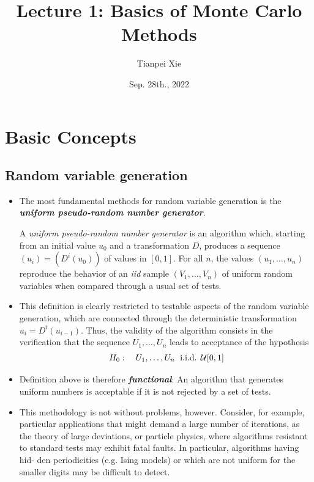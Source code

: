 \documentclass[11pt]{article}
\begin{document}
\title{Lecture 1: Basics of Monte Carlo Methods}
\author{ Tianpei Xie}
\date{Sep. 28th., 2022 }
\maketitle
\tableofcontents
\newpage
\allowdisplaybreaks
\section{Basic Concepts}
\subsection{Random variable generation}
\begin{itemize}
\item The most fundamental methods for random variable generation is the \emph{\textbf{uniform pseudo-random number generator}}.
\begin{definition}
 A \emph{uniform pseudo-random number generator} is an algorithm which, starting from an initial value $u_0$ and a transformation $D$, produces a sequence $(u_i) = (D^i(u_{0}))$ of values in $[0, 1]$. For all $n$, the values $(u_1, \ldots , u_n)$ reproduce the behavior of an \emph{iid} sample $(V_1, \ldots, V_n)$ of uniform random variables when compared through a usual set of tests.
 \end{definition}

\item This definition is clearly restricted to testable aspects of the random variable generation, which are connected through the deterministic transformation $u_i = D^{i}(u_{i-1})$. Thus, the validity of the algorithm consists in the verification that the sequence $U_1, \ldots, U_n$ leads to acceptance of the hypothesis
\begin{align*}
H_0: \quad U_1, \ldots, U_n \;\text{ i.i.d. } {\mathcal U}[0,1]
\end{align*}

\item Definition above is therefore \emph{\textbf{functional}}: An algorithm that generates uniform numbers is acceptable if it is not rejected by a set of tests. 

\item This methodology is not without problems, however. Consider, for example, particular applications that might demand a large number of iterations, as the theory of large deviations, or particle physics, where algorithms resistant to standard tests may exhibit fatal faults. In particular, algorithms having hid- den periodicities (e.g. Ising models) or which are not uniform for the smaller digits may be difficult to detect.


\end{itemize}
\end{document}
